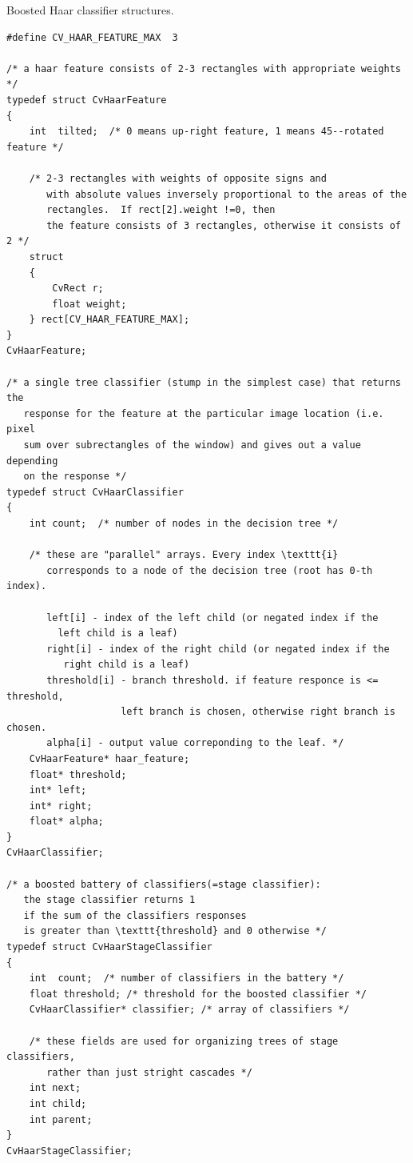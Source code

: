Boosted Haar classifier structures.

\begin{lstlisting}
#define CV_HAAR_FEATURE_MAX  3

/* a haar feature consists of 2-3 rectangles with appropriate weights */
typedef struct CvHaarFeature
{
    int  tilted;  /* 0 means up-right feature, 1 means 45--rotated feature */

    /* 2-3 rectangles with weights of opposite signs and
       with absolute values inversely proportional to the areas of the
       rectangles.  If rect[2].weight !=0, then
       the feature consists of 3 rectangles, otherwise it consists of 2 */
    struct
    {
        CvRect r;
        float weight;
    } rect[CV_HAAR_FEATURE_MAX];
}
CvHaarFeature;

/* a single tree classifier (stump in the simplest case) that returns the
   response for the feature at the particular image location (i.e. pixel
   sum over subrectangles of the window) and gives out a value depending
   on the response */
typedef struct CvHaarClassifier
{
    int count;  /* number of nodes in the decision tree */

    /* these are "parallel" arrays. Every index \texttt{i}
       corresponds to a node of the decision tree (root has 0-th index).

       left[i] - index of the left child (or negated index if the
         left child is a leaf)
       right[i] - index of the right child (or negated index if the
          right child is a leaf)
       threshold[i] - branch threshold. if feature responce is <= threshold,
                    left branch is chosen, otherwise right branch is chosen.
       alpha[i] - output value correponding to the leaf. */
    CvHaarFeature* haar_feature;
    float* threshold;
    int* left;
    int* right;
    float* alpha;
}
CvHaarClassifier;

/* a boosted battery of classifiers(=stage classifier):
   the stage classifier returns 1
   if the sum of the classifiers responses
   is greater than \texttt{threshold} and 0 otherwise */
typedef struct CvHaarStageClassifier
{
    int  count;  /* number of classifiers in the battery */
    float threshold; /* threshold for the boosted classifier */
    CvHaarClassifier* classifier; /* array of classifiers */

    /* these fields are used for organizing trees of stage classifiers,
       rather than just stright cascades */
    int next;
    int child;
    int parent;
}
CvHaarStageClassifier;


\end{lstlisting}
